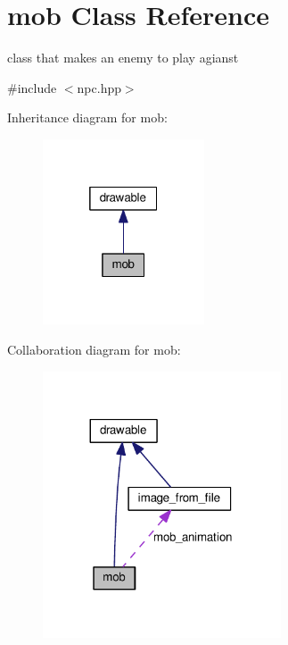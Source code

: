 \hypertarget{classmob}{}\section{mob Class Reference}
\label{classmob}


class that makes an enemy to play agianst  




{\ttfamily \#include $<$npc.\+hpp$>$}



Inheritance diagram for mob\+:\nopagebreak
\begin{figure}[H]
\begin{center}
\leavevmode
\includegraphics[width=136pt]{classmob__inherit__graph}
\end{center}
\end{figure}


Collaboration diagram for mob\+:\nopagebreak
\begin{figure}[H]
\begin{center}
\leavevmode
\includegraphics[width=200pt]{classmob__coll__graph}
\end{center}
\end{figure}
